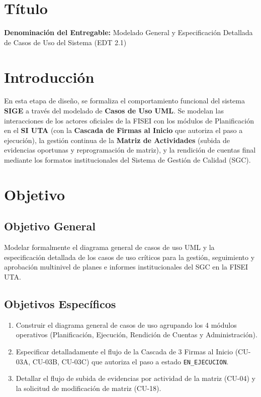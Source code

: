 \documentclass[12pt,a4paper]{article}
\begin{document}
\section{Título}
\textbf{Denominación del Entregable:} Modelado General y Especificación Detallada de Casos de Uso del Sistema (EDT 2.1)



\section{Introducción}
En esta etapa de diseño, se formaliza el comportamiento funcional del sistema \textbf{SIGE} a través del modelado de \textbf{Casos de Uso UML}. Se modelan las interacciones de los actores oficiales de la FISEI con los módulos de Planificación en el \textbf{SI UTA} (con la \textbf{Cascada de Firmas al Inicio} que autoriza el paso a ejecución), la gestión continua de la \textbf{Matriz de Actividades} (subida de evidencias oportunas y reprogramación de matriz), y la rendición de cuentas final mediante los formatos institucionales del Sistema de Gestión de Calidad (SGC).

\section{Objetivo}

\subsection{Objetivo General}
Modelar formalmente el diagrama general de casos de uso UML y la especificación detallada de los casos de uso críticos para la gestión, seguimiento y aprobación multinivel de planes e informes institucionales del SGC en la FISEI UTA.

\subsection{Objetivos Específicos}
\begin{enumerate}[leftmargin=1.5em, itemsep=2pt, topsep=2pt]
    \item Construir el diagrama general de casos de uso agrupando los 4 módulos operativos (Planificación, Ejecución, Rendición de Cuentas y Administración).
    \item Especificar detalladamente el flujo de la Cascada de 3 Firmas al Inicio (CU-03A, CU-03B, CU-03C) que autoriza el paso a estado \texttt{EN\_EJECUCION}.
    \item Detallar el flujo de subida de evidencias por actividad de la matriz (CU-04) y la solicitud de modificación de matriz (CU-18).
\end{enumerate}
\end{document}

